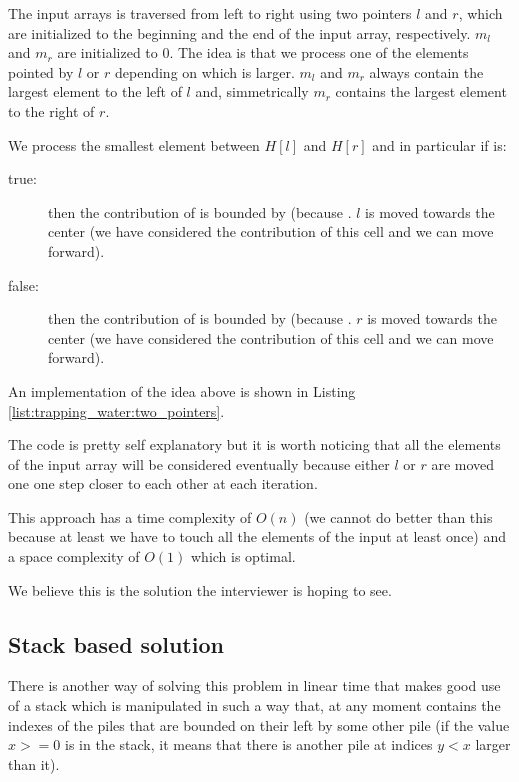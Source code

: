 The input arrays is traversed from left to right using two pointers $l$ and $r$, which are initialized to the beginning and the end of the input array, respectively.
$m_l$ and $m_r$ are initialized to $0$.
The idea is that we process one of the elements pointed by $l$ or $r$ depending on which is larger. 
$m_l$ and $m_r$ always contain the largest element to the left of $l$ and, simmetrically $m_r$ contains the largest element to the right of $r$. 

We process the smallest element between $H[l]$ and $H[r]$ and in particular if  is:
\begin{description}
	\item[true:]  then the contribution of  is bounded by  (because . $l$ is moved towards the center (we have considered the contribution of this cell and we can move forward).\\
	\item[false:] then the contribution of  is bounded by  (because . $r$ is moved towards the center (we have considered the contribution of this cell and we can move forward). \\
\end{description}

An implementation of the idea above is shown in Listing \ref{list:trapping_water:two_pointers}.



The code is pretty self explanatory but it is worth noticing that all the elements of the input array will be  considered eventually because either $l$ or $r$ are moved one one step closer to each other at each iteration. 

This approach has a time complexity of $O(n)$ (we cannot do better than this because at least we have to touch all the elements of the input at least once) and a space complexity of $O(1)$ which is optimal.

We believe this is the solution the interviewer is hoping to see. 



\subsection{Stack based solution}
\label{trapping_water:sec:stack}
There is another way of solving this problem in linear time that makes good use of a stack which is manipulated in such a way that, at any moment contains the indexes of the piles that are bounded on their left by some other pile (if the value $x>=0$ is in the stack, it means that there is another pile at indices $y<x$ larger than it).

